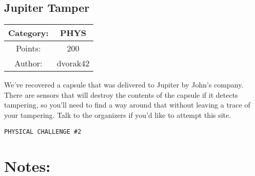 \begin{center}
\section*{Jupiter Tamper}
{\large
\begin{tabular}{| c c |}
\hline
Category: & PHYS\\\hline
Points: & 200\\\hline
Author: & dvorak42\\\hline
\end{tabular}
}
\end{center}
\vspace{0.5in}

{\large
We've recovered a capsule that was delivered to Jupiter by John's company. There are sensors that will destroy the contents of the capsule if it detects tampering, so you'll need to find a way around that without leaving a trace of your tampering. Talk to the organizers if you'd like to attempt this site.
}
\vspace{0.25in}
\begin{center}
  {\Large\tt PHYSICAL CHALLENGE \#2}
\end{center}

\vspace{0.25in}
\section*{Notes:}

